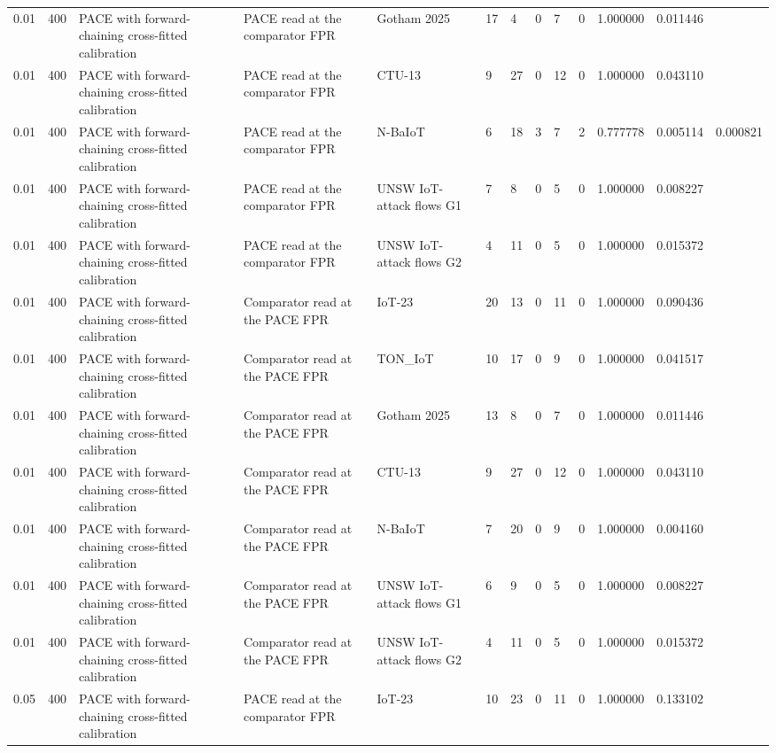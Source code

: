 \begin{tabular}{lllllllllllll}
0.01 & 400 & PACE with forward-chaining cross-fitted calibration & PACE read at the comparator FPR & Gotham 2025 & 17 & 4 & 0 & 7 & 0 & 1.000000 & 0.011446 &  \\
0.01 & 400 & PACE with forward-chaining cross-fitted calibration & PACE read at the comparator FPR & CTU-13 & 9 & 27 & 0 & 12 & 0 & 1.000000 & 0.043110 &  \\
0.01 & 400 & PACE with forward-chaining cross-fitted calibration & PACE read at the comparator FPR & N-BaIoT & 6 & 18 & 3 & 7 & 2 & 0.777778 & 0.005114 & 0.000821 \\
0.01 & 400 & PACE with forward-chaining cross-fitted calibration & PACE read at the comparator FPR & UNSW IoT-attack flows G1 & 7 & 8 & 0 & 5 & 0 & 1.000000 & 0.008227 &  \\
0.01 & 400 & PACE with forward-chaining cross-fitted calibration & PACE read at the comparator FPR & UNSW IoT-attack flows G2 & 4 & 11 & 0 & 5 & 0 & 1.000000 & 0.015372 &  \\
0.01 & 400 & PACE with forward-chaining cross-fitted calibration & Comparator read at the PACE FPR & IoT-23 & 20 & 13 & 0 & 11 & 0 & 1.000000 & 0.090436 &  \\
0.01 & 400 & PACE with forward-chaining cross-fitted calibration & Comparator read at the PACE FPR & TON\_IoT & 10 & 17 & 0 & 9 & 0 & 1.000000 & 0.041517 &  \\
0.01 & 400 & PACE with forward-chaining cross-fitted calibration & Comparator read at the PACE FPR & Gotham 2025 & 13 & 8 & 0 & 7 & 0 & 1.000000 & 0.011446 &  \\
0.01 & 400 & PACE with forward-chaining cross-fitted calibration & Comparator read at the PACE FPR & CTU-13 & 9 & 27 & 0 & 12 & 0 & 1.000000 & 0.043110 &  \\
0.01 & 400 & PACE with forward-chaining cross-fitted calibration & Comparator read at the PACE FPR & N-BaIoT & 7 & 20 & 0 & 9 & 0 & 1.000000 & 0.004160 &  \\
0.01 & 400 & PACE with forward-chaining cross-fitted calibration & Comparator read at the PACE FPR & UNSW IoT-attack flows G1 & 6 & 9 & 0 & 5 & 0 & 1.000000 & 0.008227 &  \\
0.01 & 400 & PACE with forward-chaining cross-fitted calibration & Comparator read at the PACE FPR & UNSW IoT-attack flows G2 & 4 & 11 & 0 & 5 & 0 & 1.000000 & 0.015372 &  \\
0.05 & 400 & PACE with forward-chaining cross-fitted calibration & PACE read at the comparator FPR & IoT-23 & 10 & 23 & 0 & 11 & 0 & 1.000000 & 0.133102 &  \\

\end{tabular}
